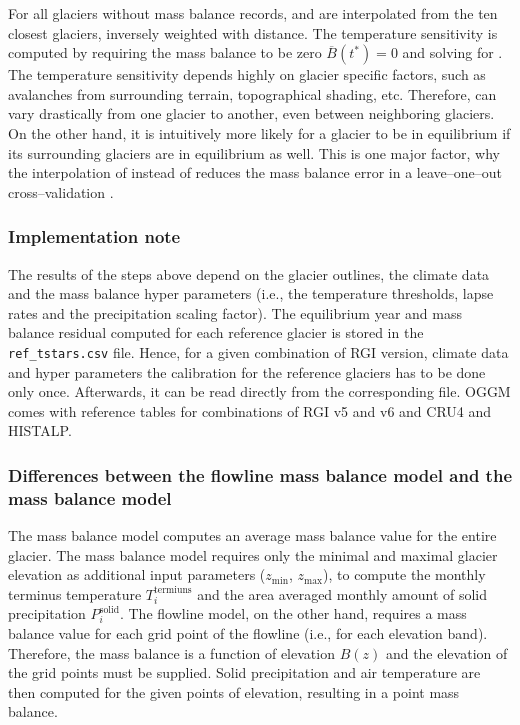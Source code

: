            For all glaciers without mass balance records, \tstar{} and \bias{} are interpolated from the ten closest glaciers, inversely weighted with distance. The temperature sensitivity is computed by requiring the mass balance to be zero $\overline B(t^*) = 0$ and solving for \mustar{}. The temperature sensitivity \mustar{} depends highly on glacier specific factors, such as avalanches from surrounding terrain, topographical shading, etc. Therefore, \mustar{} can vary drastically from one glacier to another, even between neighboring glaciers. On the other hand, it is intuitively more likely for a glacier to be in equilibrium if its surrounding glaciers are in equilibrium as well. This is one major factor, why the interpolation of \tstar{} instead of \mustar{} reduces the mass balance error in a leave--one--out cross--validation \citep[cf.][]{Marzeion2012b, Maussion2019}.



        \subsubsection{Implementation note} %
        \label{ssub:mb_calib_implementation_note}

            The results of the steps above depend on the glacier outlines, the climate data and the mass balance hyper parameters (i.e., the temperature thresholds, lapse rates and the precipitation scaling factor). The equilibrium year \tstar{} and mass balance residual \bias{} computed for each reference glacier is stored in the \lstinline`ref_tstars.csv` file. Hence, for a given combination of RGI version, climate data and hyper parameters the calibration for the reference glaciers has to be done only once. Afterwards, it can be read directly from the corresponding file. OGGM comes with reference tables for combinations of RGI v5 and v6 and CRU4 and HISTALP.
        

        \subsubsection{Differences between the flowline mass balance model and the \vas{} mass balance model}

            The \vas{} mass balance model computes an average mass balance value for the entire glacier. The mass balance model requires only the minimal and maximal glacier elevation as additional input parameters ($z_\text{min}$, $z_\text{max}$), to compute the monthly terminus temperature $T_i^\text{termiuns}$ and the area averaged monthly amount of solid precipitation $P_i^\text{solid}$. The flowline model, on the other hand, requires a mass balance value for each grid point of the flowline (i.e., for each elevation band). Therefore, the mass balance is a function of elevation $B(z)$ and the elevation of the grid points must be supplied. Solid precipitation and air temperature are then computed for the given points of elevation, resulting in a point mass balance.
    
